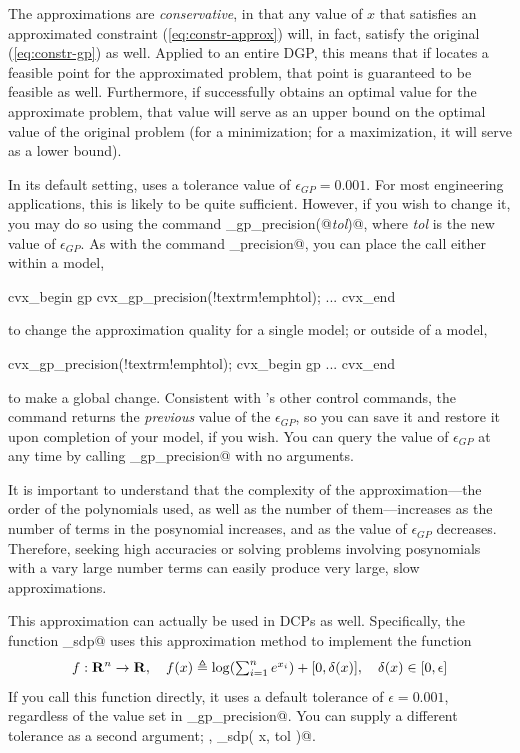 \documentclass[12pt]{article}
\begin{document}
The approximations are \emph{conservative}, in that any value of $x$ that
satisfies an approximated constraint (\ref{eq:constr-approx})
will, in fact, satisfy the original (\ref{eq:constr-gp}) as well.
Applied to an entire DGP, this means that if \cvx locates a feasible point for
the approximated problem, that point is guaranteed to be feasible as well.
Furthermore, if \cvx successfully obtains an optimal value for the approximate
problem, that value will serve as an upper bound on the optimal value of
the original problem (for a minimization; for a maximization, it will serve
as a lower bound). 

In its default setting, \cvx uses a tolerance value of $\epsilon_{GP}=0.001$.
For most engineering applications, this is likely to be quite sufficient. However,
if you wish to change it, you may do so using the command
\verb@cvx_gp_precision(@\emph{tol}\verb@)@,
where \emph{tol} is the new value of $\epsilon_{GP}$. As with the command
\verb@cvx_precision@, you can place the call either within a model,
\begin{code}[commandchars=\!\{\}]
	cvx_begin gp
	    cvx_gp_precision(!textrm{!emph{tol}});
	    ...
	cvx_end
\end{code}
to change the approximation quality for a single model; or outside of a model,
\begin{code}[commandchars=\!\{\}]
	cvx_gp_precision(!textrm{!emph{tol}});
	cvx_begin gp
	    ...
	cvx_end
\end{code}
to make a global change. Consistent with
\cvx's other control commands, the command returns the \emph{previous}
value of the $\epsilon_{GP}$, so you can save it and restore it upon completion
of your model, if you wish. You can query the value of $\epsilon_{GP}$ at any
time by calling \verb@cvx_gp_precision@ with no arguments. 

It is important to understand that the complexity of the approximation---the order of
the polynomials used, as well as the number of them---increases as the
number of terms in the posynomial increases, and as the value of $\epsilon_{GP}$
decreases. Therefore, seeking high accuracies or solving problems involving 
posynomials with a vary large number terms can easily produce very large, slow
approximations.

This approximation can actually be used in DCPs as well.
Specifically, the function \verb@logsumexp_sdp@ uses this approximation
method to implement the function
\begin{equation}
	f:\Rn\rightarrow\R, \quad f(x) \eqbydef \log(\TS\sum_{i=1}^n e^{x_i}) + [0,\delta(x)], \quad \delta(x)\in[0,\epsilon]
\end{equation}
If you call this function directly, it uses a default tolerance of $\epsilon=0.001$, regardless
of the value set in \verb@cvx_gp_precision@. You can supply a different tolerance as a second
argument; \ie, \verb@logsumexp_sdp( x, tol )@.
\fi
\end{document}
